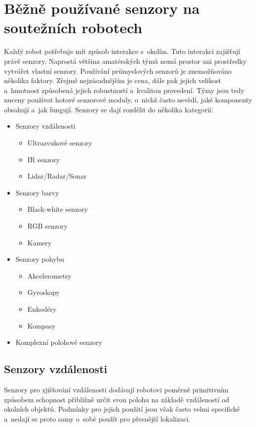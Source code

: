 \chapter{Běžně používané senzory na soutežních robotech}

Každý robot potřebuje mít způsob interakce s~okolím.
Tuto interakci zajišťují právě senzory.
Naprostá většina amatérských týmů nemá prostor ani pros\-třed\-ky vytvářet vlastní senzory.
Používání průmyslových senzorů je zne\-mož\-ňo\-vá\-no několika faktory.
Zřejmě nejzásadnějším je cena, dále pak jejich velikost a~hmotnost způsobená jejich robustností a~kvalitou provedení.
Týmy jsou tedy nuceny používat hotové senzorové moduly, o~nichž často nevědí, jaké komponenty obsahují a~jak fungují.
Senzory se dají rozdělit do několika kategorií:
\begin{itemize}
    \item Senzory vzdálenosti
        \begin{itemize}
            \item Ultrazvukové senzory
            \item IR senzory
            \item Lidar/Radar/Sonar
        \end{itemize}
    \item Senzory barvy
        \begin{itemize}
            \item Black-white senzory
            \item RGB senzory
            \item Kamery
        \end{itemize}
    \item Senzory pohybu
        \begin{itemize}
            \item Akcelerometry
            \item Gyroskopy
            \item Enkodéry
            \item Kompasy
        \end{itemize}
    \item Komplexní polohové senzory
\end{itemize}

\section{Senzory vzdálenosti}

Senzory pro zjišťování vzdálenosti dodávají robotovi poměrně primitivním způsobem schopnost přibližně určit svou polohu na základě vzdáleností od okolních objektů.
Podmínky pro jejich použití jsou však často velmi specifické a~nedají se proto samy o~sobě použít pro přesnější lokalizaci.

